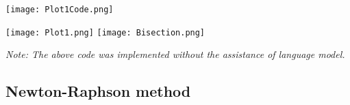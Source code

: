 \documentclass{article}
\begin{document}
\begin{enumerate}
\begin{tcolorbox}[colback=blue!10, colframe=gray!80, width=\textwidth, sharp corners]
\end{tcolorbox}
\end{enumerate}
\begin{tcolorbox}[colback=gray!10, colframe=gray!80, width=\textwidth, sharp corners]
    \centering 
    \texttt{[image: Plot1Code.png]} 

    \texttt{[image: Plot1.png]}
    \texttt{[image: Bisection.png]}

    \vspace{0.5cm} 
    
    \vspace{0.5cm}
    \small\textit{Note: The above code was implemented without the assistance of language model.}
\end{tcolorbox}

\subsection{Newton-Raphson method}
\end{document}
